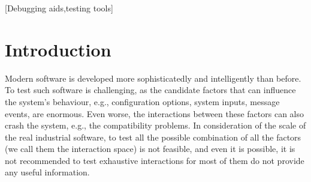 \documentclass{sig-alternate}
\begin{document}
\begin{abstract}
\end{abstract}

[Debugging aids,testing tools]



\section{Introduction}

Modern software is developed more sophisticatedly and intelligently than before. To test such software is challenging, as the candidate factors that can influence the system's behaviour, e.g., configuration options, system inputs, message events, are enormous. Even worse, the interactions between these factors can also crash the system, e.g., the compatibility problems. In consideration of the scale of the real industrial software, to test all the possible combination of all the factors (we call them the interaction space) is not feasible, and even it is possible, it is not recommended to test exhaustive interactions for most of them do not provide any useful information.
\end{document}
